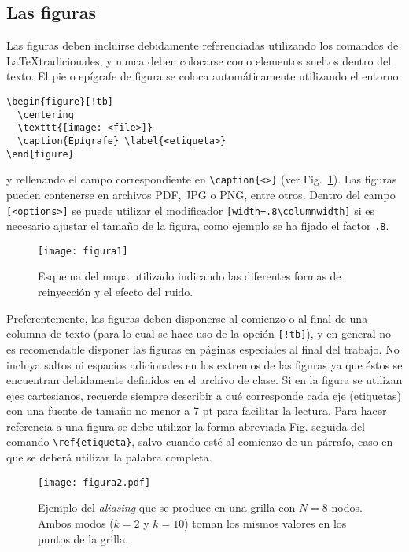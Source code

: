 \documentclass[esp]{FCEFyN-class}
\begin{document}
\subsection{Las figuras}
Las figuras deben incluirse debidamente referenciadas utilizando los comandos de \LaTeX tradicionales,
y nunca deben colocarse como elementos sueltos dentro del texto.
El pie o epígrafe de figura se coloca automáticamente utilizando el entorno
\begin{verbatim}
\begin{figure}[!tb]
  \centering
  \texttt{[image: <file>]}
  \caption{Epígrafe} \label{<etiqueta>}
\end{figure}
\end{verbatim}
y rellenando el campo correspondiente en \verb!\caption{<>}! (ver Fig.~\ref{fig-1}). Las figuras pueden contenerse en archivos PDF, JPG o PNG, entre otros. Dentro del campo \verb![<options>]! se puede utilizar el modificador
\verb![width=.8\columnwidth]! si es necesario ajustar el tamaño de la figura, como ejemplo se ha fijado el
factor \verb!.8!.

\begin{figure}[!tb] 
 \centering
 \texttt{[image: figura1]} 
 \caption{Esquema del mapa utilizado indicando las diferentes formas de reinyección y el efecto
          del ruido.} \label{fig-1}
\end{figure}

Preferentemente, las figuras deben disponerse al comienzo o al final de una columna de texto (para lo
cual se hace uso de la opción \texttt{[!tb]}), y en general no es recomendable disponer las figuras en
páginas especiales al final del trabajo.
No incluya saltos ni espacios adicionales en los extremos de las figuras ya que éstos se encuentran
debidamente definidos en el archivo de clase.
Si en la figura se utilizan ejes cartesianos, recuerde siempre describir a qué corresponde cada
eje (etiquetas) con una fuente de tamaño no menor a 7 pt para facilitar la lectura.
Para hacer referencia a una figura se debe utilizar la forma abreviada Fig. seguida
del comando \verb!\ref{etiqueta}!, salvo cuando esté al comienzo de un párrafo, caso en que se
deberá utilizar la palabra completa.

\begin{figure*}[!tb] 
 \centering
 \texttt{[image: figura2.pdf]} 
 \caption{Ejemplo del \emph{aliasing} que se produce en una grilla con $N = 8$ nodos. Ambos modos
          ($k = 2$ y $k = 10$) toman los mismos valores en los puntos de la grilla.} \label{fig-2}
\end{figure*}
\end{document}
